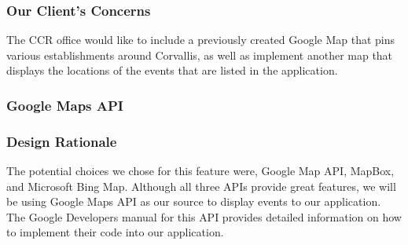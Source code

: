 \documentclass[draftclsnofoot, onecolumn, 10pt, compsoc]{IEEEtran}
\begin{document}
			\subsubsection{Our Client's Concerns}
				The CCR office would like to include a previously created Google Map that pins various establishments around Corvallis, as well as implement another map that displays the locations of the events that are listed in the application. 
			\subsubsection{Google Maps API}
			\subsubsection{Design Rationale}
				The potential choices we chose for this feature were, Google Map API, MapBox, and Microsoft Bing Map. Although all three APIs provide great features, we will be using Google Maps API as our source to display events to our application. The Google Developers manual for this API provides detailed information on how to implement their code into our application.
	
\end{document}
